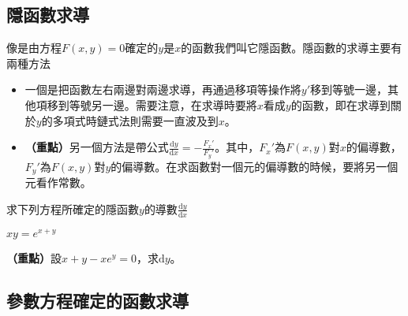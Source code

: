 \documentclass[12pt, addpoints]{exam}
\def \important{\textbf{（重點）}}
\def \d{\mathrm{d}}
\begin{document}
\subsection{隱函數求導}

\begin{questions}

\question
像是由方程$F(x,y)=0$確定的$y$是$x$的函數我們叫它隱函數。隱函數的求導主要有兩種方法\begin{itemize}
    \item 一個是把函數左右兩邊對兩邊求導，再通過移項等操作將$y'$移到等號一邊，其他項移到等號另一邊。需要注意，在求導時要將$x$看成$y$的函數，即在求導到關於$y$的多項式時鏈式法則需要一直波及到$x$。
    \item \important 另一個方法是帶公式$\displaystyle \frac{\d y}{\d x} = -\frac{F_x'}{F_y'}$。其中，$F_x'$為$F(x,y)$對$x$的偏導數，$F_y'$為$F(x,y)$對$y$的偏導數。在求函數對一個元的偏導數的時候，要將另一個元看作常數。
\end{itemize}

\question[1]
求下列方程所確定的隱函數$y$的導數$\displaystyle \frac{\d y}{\d x}$

$xy=e^{x+y}$

\question[1]
\important 設$x+y-xe^y=0$，求$\d y$。

\end{questions}

\newpage %

\subsection{參數方程確定的函數求導}
\end{document}
